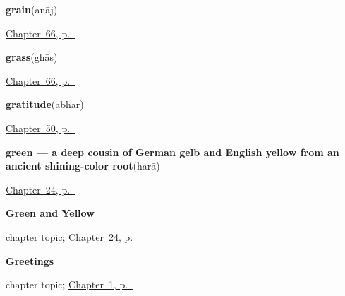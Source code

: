\noindent\begin{minipage}[t]{\linewidth}
\raggedright
\textbf{grain}\enspace\emph{}\enspace(anāj)\par
\footnotesize \hyperref[ch:hi-the-field-and-the-well]{Chapter~66, p.~\pageref*{ch:hi-the-field-and-the-well}}
\end{minipage}\par\smallskip

\noindent\begin{minipage}[t]{\linewidth}
\raggedright
\textbf{grass}\enspace\emph{}\enspace(ghās)\par
\footnotesize \hyperref[ch:hi-the-field-and-the-well]{Chapter~66, p.~\pageref*{ch:hi-the-field-and-the-well}}
\end{minipage}\par\smallskip

\noindent\begin{minipage}[t]{\linewidth}
\raggedright
\textbf{gratitude}\enspace\emph{}\enspace(ābhār)\par
\footnotesize \hyperref[ch:hi-courtesy]{Chapter~50, p.~\pageref*{ch:hi-courtesy}}
\end{minipage}\par\smallskip

\noindent\begin{minipage}[t]{\linewidth}
\raggedright
\textbf{green — a deep cousin of German gelb and English yellow from an ancient shining-color root}\enspace\emph{}\enspace(harā)\par
\footnotesize \hyperref[ch:hi-green-and-yellow]{Chapter~24, p.~\pageref*{ch:hi-green-and-yellow}}
\end{minipage}\par\smallskip

\noindent\begin{minipage}[t]{\linewidth}
\raggedright
\textbf{Green and Yellow}\par
\footnotesize chapter topic; \hyperref[ch:hi-green-and-yellow]{Chapter~24, p.~\pageref*{ch:hi-green-and-yellow}}
\end{minipage}\par\smallskip

\noindent\begin{minipage}[t]{\linewidth}
\raggedright
\textbf{Greetings}\par
\footnotesize chapter topic; \hyperref[ch:greetings]{Chapter~1, p.~\pageref*{ch:greetings}}
\end{minipage}\par\smallskip

